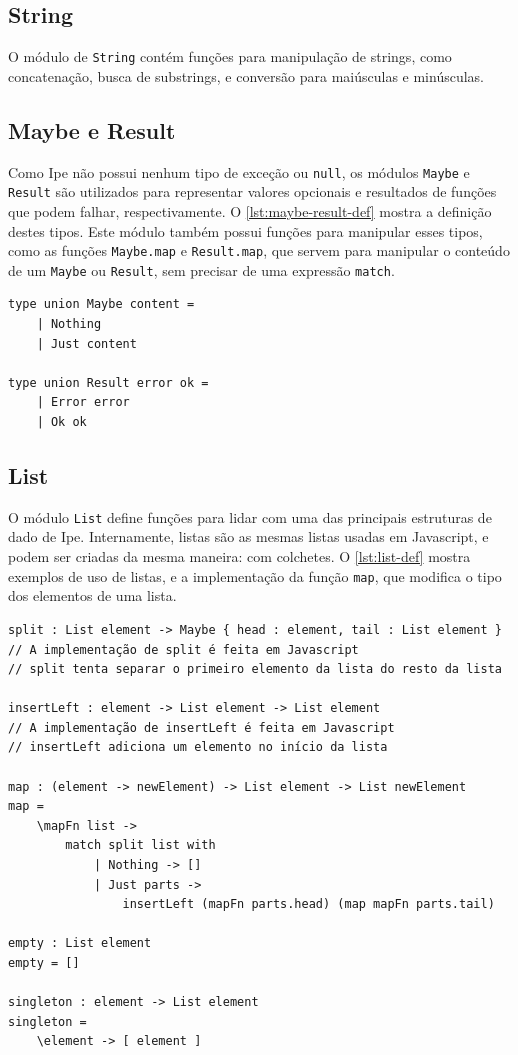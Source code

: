 \subsection{String}

O módulo de \texttt{String} contém funções para manipulação de strings, como
concatenação, busca de substrings, e conversão para maiúsculas e minúsculas.

\subsection{Maybe e Result}

Como Ipe não possui nenhum tipo de exceção ou \texttt{null}, os módulos \texttt{Maybe}
e \texttt{Result} são utilizados para representar valores opcionais e resultados
de funções que podem falhar, respectivamente. O \autoref{lst:maybe-result-def}
mostra a definição destes tipos. Este módulo também possui funções para manipular
esses tipos, como as funções \texttt{Maybe.map} e \texttt{Result.map}, que servem
para manipular o conteúdo de um \texttt{Maybe} ou \texttt{Result}, sem precisar
de uma expressão \texttt{match}.

\begin{lstlisting}[label={lst:maybe-result-def},caption={Definição de \texttt{Maybe} e \texttt{Result}}]
type union Maybe content =
    | Nothing
    | Just content

type union Result error ok =
    | Error error
    | Ok ok
\end{lstlisting}


\subsection{List}

O módulo \texttt{List} define funções para lidar com uma das principais estruturas de dado de Ipe.
Internamente, listas são as mesmas listas usadas em Javascript, e podem ser criadas da mesma maneira:
com colchetes. O \autoref{lst:list-def} mostra exemplos de uso de listas, e a implementação da função
\texttt{map}, que modifica o tipo dos elementos de uma lista.

\begin{lstlisting}[label={lst:list-def},caption={Parte do módulo de listas de Ipe}]
split : List element -> Maybe { head : element, tail : List element }
// A implementação de split é feita em Javascript
// split tenta separar o primeiro elemento da lista do resto da lista

insertLeft : element -> List element -> List element
// A implementação de insertLeft é feita em Javascript
// insertLeft adiciona um elemento no início da lista

map : (element -> newElement) -> List element -> List newElement
map =
    \mapFn list ->
        match split list with
            | Nothing -> []
            | Just parts ->
                insertLeft (mapFn parts.head) (map mapFn parts.tail)

empty : List element
empty = []

singleton : element -> List element
singleton =
    \element -> [ element ]

\end{lstlisting}

